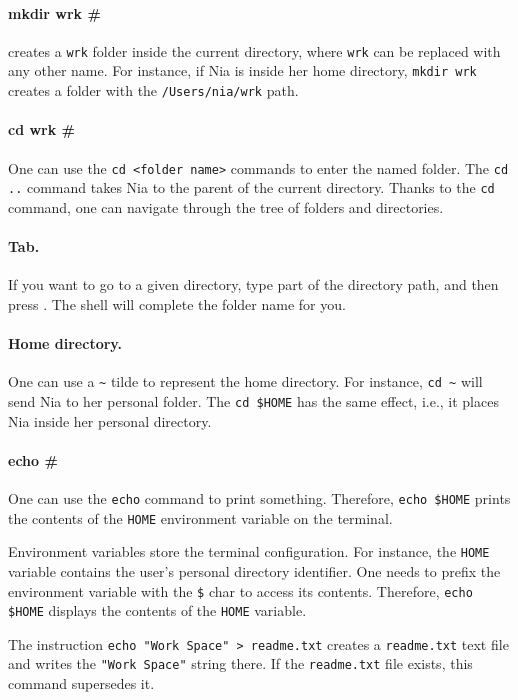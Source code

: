 \documentclass[a4paper,12pt]{book}
\begin{document}
\paragraph{mkdir wrk \#} creates a \verb|wrk|
folder inside the current directory,
where \verb|wrk| can be replaced
with any other name.
For instance, if Nia is inside her
home directory, \verb|mkdir wrk| creates
a folder with the \verb|/Users/nia/wrk| path.

\paragraph{cd wrk \#} One can use the
\verb|cd <folder name>| commands to enter
the named folder.
The \verb|cd ..|  command
takes Nia to the parent of the current
directory.
Thanks to the \verb|cd|
command, one can navigate through the
tree of folders and directories.

\paragraph{Tab.} If you want to go
to a given directory, type part of the directory
path, and then press .
The shell will complete the folder name for you.

\paragraph{Home directory.} One
can use a \verb|~| tilde to represent
the home directory. For instance,
\verb|cd ~| will send Nia to her
personal folder. The \verb|cd $HOME| has
the same effect, i.e., it places Nia inside
her personal directory.

\paragraph{echo \#} One can use the
\verb|echo| command to print something.
Therefore, \verb|echo $HOME| prints
the contents of the \verb|HOME|
environment variable on the terminal.

Environment variables store
the terminal configuration. For instance,
the \verb|HOME| variable contains
the user's personal directory identifier.
One needs to prefix the environment
variable with the \verb|$| char
to access its contents. Therefore,
\verb|echo $HOME| displays the
contents of the \verb|HOME| variable.

The instruction \verb|echo "Work Space" > readme.txt|
creates a \verb|readme.txt| text file and
writes the \verb|"Work Space"| string there.
If the \verb|readme.txt| file exists,
this command supersedes it.
\end{document}
